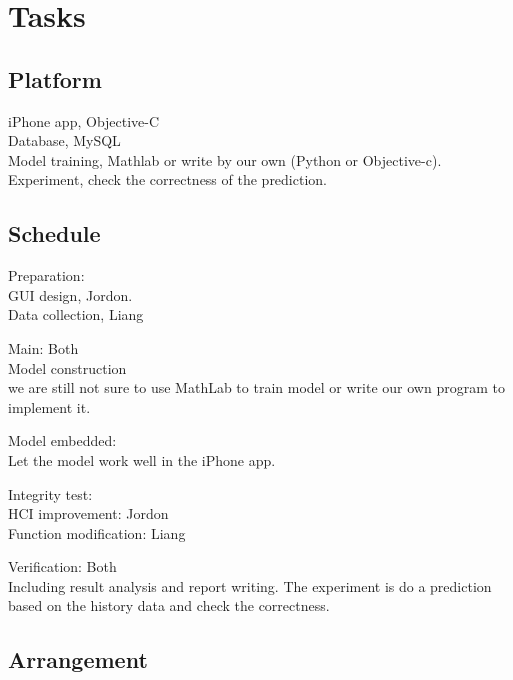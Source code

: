 \documentclass[12pt]{article}
\begin{document}
\section{Tasks}


\subsection{Platform}
iPhone app, Objective-C\\
Database, MySQL\\
Model training, Mathlab or write by our own (Python or Objective-c).\\
Experiment, check the correctness of the prediction.\\

\subsection{Schedule}
Preparation: \\
    GUI design, Jordon. \\
    Data collection, Liang

Main: Both\\
    Model construction \\  
    we are still not sure to use MathLab to train model or write our
    own program to implement it.

    Model embedded: \\
    Let the model work well in the iPhone app.

Integrity test: \\
    HCI improvement: Jordon \\ 
    Function modification:  Liang 

Verification: Both\\
    Including result analysis and report writing. The experiment is do
    a prediction based on the history data and check the correctness.

\subsection{Arrangement}
  \begin{gantt}{7}{8}
    \begin{ganttitle}
    \end{ganttitle}
  \end{gantt}
\end{document}

